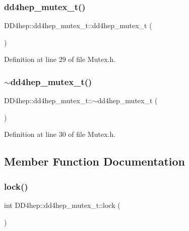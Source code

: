 \subsubsection{\texorpdfstring{dd4hep\+\_\+mutex\+\_\+t()}{dd4hep\_mutex\_t()}}
{\footnotesize\ttfamily D\+D4hep\+::dd4hep\+\_\+mutex\+\_\+t\+::dd4hep\+\_\+mutex\+\_\+t (\begin{DoxyParamCaption}{ }\end{DoxyParamCaption})\hspace{0.3cm}{\ttfamily [inline]}}



Definition at line 29 of file Mutex.\+h.

\hypertarget{struct_d_d4hep_1_1dd4hep__mutex__t_addd31c44ebdd2c7097c4778b3f2b9cb8}{}\label{struct_d_d4hep_1_1dd4hep__mutex__t_addd31c44ebdd2c7097c4778b3f2b9cb8} 
\subsubsection{\texorpdfstring{$\sim$dd4hep\+\_\+mutex\+\_\+t()}{~dd4hep\_mutex\_t()}}
{\footnotesize\ttfamily D\+D4hep\+::dd4hep\+\_\+mutex\+\_\+t\+::$\sim$dd4hep\+\_\+mutex\+\_\+t (\begin{DoxyParamCaption}{ }\end{DoxyParamCaption})\hspace{0.3cm}{\ttfamily [inline]}}



Definition at line 30 of file Mutex.\+h.



\subsection{Member Function Documentation}
\hypertarget{struct_d_d4hep_1_1dd4hep__mutex__t_a7d871d008c53d730b892d64cf0b49e29}{}\label{struct_d_d4hep_1_1dd4hep__mutex__t_a7d871d008c53d730b892d64cf0b49e29} 
\subsubsection{\texorpdfstring{lock()}{lock()}}
{\footnotesize\ttfamily int D\+D4hep\+::dd4hep\+\_\+mutex\+\_\+t\+::lock (\begin{DoxyParamCaption}{ }\end{DoxyParamCaption})\hspace{0.3cm}{\ttfamily [inline]}}



